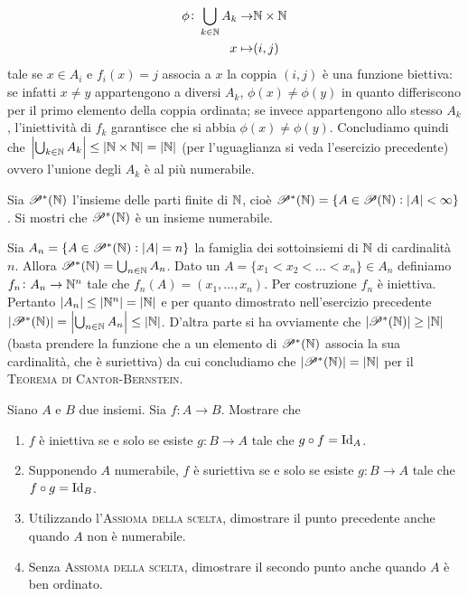\documentclass[a4paper]{article}\par \usepackage{style}\par
\begin{document}
\begin{align*}
  \phi \colon \bigcup_{k \in \mathbb{N}} A_k \to & \mathbb{N} \times \mathbb{N} \\
  x \mapsto & (i, j)
\end{align*}
tale se $ x \in A_i $ e $ f_i(x) = j $ associa a $ x $ la coppia $ (i, j) $ è una funzione biettiva: se infatti $ x \neq y $ appartengono a diversi $ A_k $, $ \phi(x) \neq \phi(y) $ in quanto differiscono per il primo elemento della coppia ordinata; se invece appartengono allo stesso $ A_k $, l'iniettività di $ f_k $ garantisce che si abbia $ \phi(x) \neq \phi(y) $. Concludiamo quindi che $ \left|\bigcup_{k \in \mathbb{N}}A_k\right| \leq |\mathbb{N} \times \mathbb{N}| = |\mathbb{N}| $ (per l'uguaglianza si veda l'esercizio precedente) ovvero l'unione degli $ A_k $ è al più numerabile.\par \begin{es}
  Sia $ \mathscr{P}^*(\mathbb{N}) $ l'insieme delle parti finite di $ \mathbb{N} $, cioè $ \mathscr{P}^*(\mathbb{N}) = \{A \in \mathscr{P}(\mathbb{N}) : |A| < \infty\} $. Si mostri che $ \mathscr{P}^*(\mathbb{N}) $ è un insieme numerabile.
\end{es}
Sia $ A_n = \{A \in \mathscr{P}^*(\mathbb{N}) : |A| = n\} $ la famiglia dei sottoinsiemi di $ \mathbb{N} $ di cardinalità $ n $. Allora $ \mathscr{P}^*(\mathbb{N}) = \bigcup_{n \in \mathbb{N}} A_n $. Dato un $ A = \{x_1 < x_2 < \dots < x_n\} \in A_n $ definiamo $ f_n \colon A_n \to \mathbb{N}^n $ tale che $ f_n(A) = (x_1, \dots, x_n) $. Per costruzione $ f_n $ è iniettiva. Pertanto $ |A_n| \leq |\mathbb{N}^n| = |\mathbb{N}| $ e per quanto dimostrato nell'esercizio precedente $ |\mathscr{P}^*(\mathbb{N})| = \left|\bigcup_{n \in \mathbb{N}} A_n\right| \leq |\mathbb{N}| $. D'altra parte si ha ovviamente che $ |\mathscr{P}^*(\mathbb{N})| \geq |\mathbb{N}| $ (basta prendere la funzione che a un elemento di $ \mathscr{P}^*(\mathbb{N}) $ associa la sua cardinalità, che è suriettiva) da cui concludiamo che $ |\mathscr{P}^*(\mathbb{N})| = |\mathbb{N}| $ per il \textsc{Teorema di Cantor-Bernstein}.\par \begin{es}
  Siano $ A $ e $ B $ due insiemi. Sia $ f \colon A \to B $. Mostrare che
  \begin{enumerate}
  \item $ f $ è iniettiva se e solo se esiste $ g \colon B \to A $ tale che $ g \circ f = \mathrm{Id}_A $.
  \item Supponendo $ A $ numerabile, $ f $ è suriettiva se e solo se esiste $ g \colon B \to A $ tale che $ f \circ g = \mathrm{Id}_B $.
  \item Utilizzando l'\textsc{Assioma della scelta}, dimostrare il punto precedente anche quando $ A $ non è numerabile.
  \item Senza \textsc{Assioma della scelta}, dimostrare il secondo punto anche quando $ A $ è ben ordinato.
  \end{enumerate}
\end{es}
\end{document}
